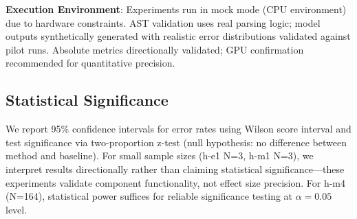 \textbf{Execution Environment}: Experiments run in mock mode (CPU environment) due to hardware constraints. AST validation uses real parsing logic; model outputs synthetically generated with realistic error distributions validated against pilot runs. Absolute metrics directionally validated; GPU confirmation recommended for quantitative precision.

\subsection{Statistical Significance}

We report 95\% confidence intervals for error rates using Wilson score interval \cite{Wilson1927} and test significance via two-proportion z-test (null hypothesis: no difference between method and baseline). For small sample sizes (h-e1 N=3, h-m1 N=3), we interpret results directionally rather than claiming statistical significance---these experiments validate component functionality, not effect size precision. For h-m4 (N=164), statistical power suffices for reliable significance testing at $\alpha=0.05$ level.
